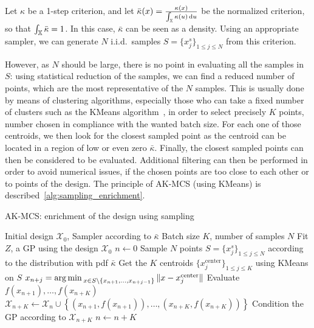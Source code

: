 \documentclass[../../Main_ManuscritThese.tex]{subfiles}
\begin{document}
Let $\kappa$ be a 1-step criterion, and let
$\bar{\kappa}(x) =
\frac{\kappa(x)}{\int_{\mathbb{X}}\kappa(u)\,\mathrm{d}u}$ be the
normalized criterion, so that $\int_{\mathbb{X}} \bar{\kappa}=1$. In this
case, $\bar{\kappa}$ can be seen as a density.  Using an appropriate
sampler, we can generate $N$ i.i.d.\ samples
$S=\{x_j^s\}_{1\leq j \leq N}$ from this criterion.

  
However, as $N$ should be large, there is no point in evaluating all
the samples in $S$: using statistical reduction of the samples, we can
find a reduced number of points, which are the most representative of
the $N$ samples. This is usually done by means of clustering
algorithms, especially those who can take a fixed number of clusters
such as the KMeans algorithm~\citep{macqueen_methods_1967}, in order
to select precisely $K$ points, number chosen in compliance with the
wanted batch size. For each one of those centroids, we then look for
the closest sampled point as the centroid can be located in a region
of low or even zero $\bar{\kappa}$. Finally, the closest sampled
points can then be considered to be evaluated.  Additional filtering
can then be performed in order to avoid numerical issues, if the
chosen points are too close to each other or to points of the design.
The principle of AK-MCS (using KMeans) is
described~\cref{alg:sampling_enrichment}.

\begin{algorithm}
\caption{AK-MCS: enrichment of the design using sampling}
\label{alg:sampling_enrichment}
\begin{algorithmic}
  \REQUIRE Initial design $\mathcal{X}_0$, Sampler according to $\bar{\kappa}$
  \REQUIRE Batch size $K$, number of samples $N$
\STATE Fit $Z$, a GP using the design $\mathcal{X}_0$
\STATE $n \leftarrow 0$
\STATE Sample $N$ points $S = \{x^s_j\}_{1 \leq j \leq N}$ according to the distribution with pdf $\bar{\kappa}$
\STATE Get the $K$ centroids $\{x_j^{\mathrm{center}}\}_{1 \leq j \leq K}$ using KMeans on $S$
\STATE $x_{n+j}=\operatorname*{arg\,min \,}_{x \in S \setminus \{x_{n+1}, \dots, x_{n+j-1}\}} \|x - x_j^{\mathrm{center}} \|$
\ENDFOR
\STATE Evaluate $f(x_{n+1}),\dots, f(x_{n+K})$
\STATE $\mathcal{X}_{n+K} \leftarrow \mathcal{X}_n \cup \left\{\left(x_{n+1}, f(x_{n+1})\right),\dots,  \left(x_{n+K}, f(x_{n+K})\right)\right\}$
\STATE Condition the GP according to $\mathcal{X}_{n+K}$
\STATE $n \leftarrow n + K$
\ENDWHILE
\end{algorithmic}
\end{algorithm}
\end{document}
